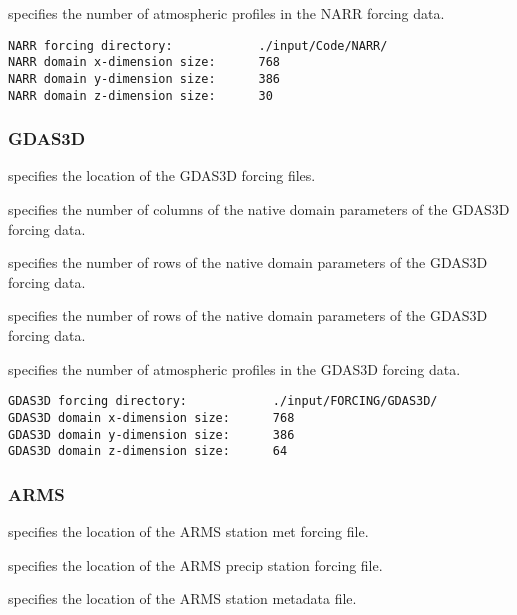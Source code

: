   specifies the number of
 atmospheric profiles in the NARR forcing data.
 

 \begin{Verbatim}[frame=single]
NARR forcing directory:            ./input/Code/NARR/
NARR domain x-dimension size:      768
NARR domain y-dimension size:      386
NARR domain z-dimension size:      30
 \end{Verbatim}

 
 
 \subsubsection{GDAS3D} \label{sssec:supp_gdas3d}
 

 
  specifies the location of the
 GDAS3D forcing files.

  specifies the number of
 columns of the native domain parameters of the GDAS3D forcing data.

  specifies the number of
 rows of the native domain parameters of the GDAS3D forcing data.

  specifies the number of
 rows of the native domain parameters of the GDAS3D forcing data.

  specifies the number of
 atmospheric profiles in the GDAS3D forcing data.
 

 \begin{Verbatim}[frame=single]
GDAS3D forcing directory:            ./input/FORCING/GDAS3D/
GDAS3D domain x-dimension size:      768
GDAS3D domain y-dimension size:      386
GDAS3D domain z-dimension size:      64
 \end{Verbatim}
 

 
 
 \subsubsection{ARMS} \label{sssec:supp_arms}
 

 
  specifies the location of the
 ARMS station met forcing file.

  specifies the location of the
 ARMS precip station forcing file.

  specifies the location of the
 ARMS station metadata file.
 

